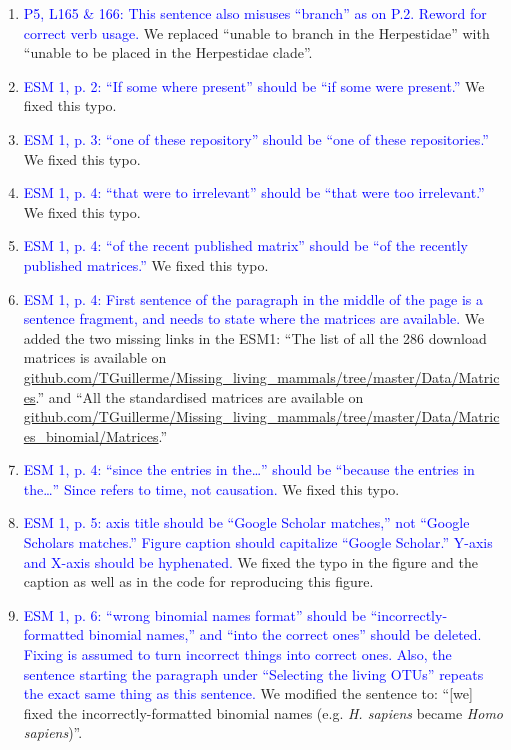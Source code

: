 \documentclass[12pt,letterpaper]{article}
\begin{document}
\begin{enumerate}
\item{\textcolor{blue}{P5, L165 \& 166: This sentence also misuses ``branch'' as on P.2. Reword for correct verb usage.}}
We replaced ``unable to branch in the Herpestidae'' with ``unable to be placed in the Herpestidae clade''.

\item{\textcolor{blue}{ESM 1, p. 2: ``If some where present'' should be ``if some were present.''}}
We fixed this typo.

\item{\textcolor{blue}{ESM 1, p. 3: ``one of these repository'' should be ``one of these repositories.''}}
We fixed this typo.

\item{\textcolor{blue}{ESM 1, p. 4: ``that were to irrelevant'' should be ``that were too irrelevant.''}}
We fixed this typo.

\item{\textcolor{blue}{ESM 1, p. 4: ``of the recent published matrix'' should be ``of the recently published matrices.''}}
We fixed this typo.

\item{\textcolor{blue}{ESM 1, p. 4: First sentence of the paragraph in the middle of the page is a sentence fragment, and needs to state where the matrices are available.}}
We added the two missing links in the ESM1: ``The list of all the 286 download matrices is available on \url{github.com/TGuillerme/Missing_living_mammals/tree/master/Data/Matrices}.'' and ``All the standardised matrices are available on \url{github.com/TGuillerme/Missing_living_mammals/tree/master/Data/Matrices_binomial/Matrices}.''

\item{\textcolor{blue}{ESM 1, p. 4: ``since the entries in the…'' should be ``because the entries in the…'' Since refers to time, not causation.}}
We fixed this typo.

\item{\textcolor{blue}{ESM 1, p. 5: axis title should be ``Google Scholar matches,'' not ``Google Scholars matches.'' Figure caption should capitalize ``Google Scholar.'' Y-axis and X-axis should be hyphenated.}}
We fixed the typo in the figure and the caption as well as in the code for reproducing this figure.

\item{\textcolor{blue}{ESM 1, p. 6: ``wrong binomial names format'' should be ``incorrectly-formatted binomial names,'' and ``into the correct ones'' should be deleted.
Fixing is assumed to turn incorrect things into correct ones.
Also, the sentence starting the paragraph under ``Selecting the living OTUs'' repeats the exact same thing as this sentence.}}
We modified the sentence to: ``[we] fixed the incorrectly-formatted binomial names (e.g. \textit{H. sapiens} became \textit{Homo sapiens})''.


\end{enumerate}
\end{document}
